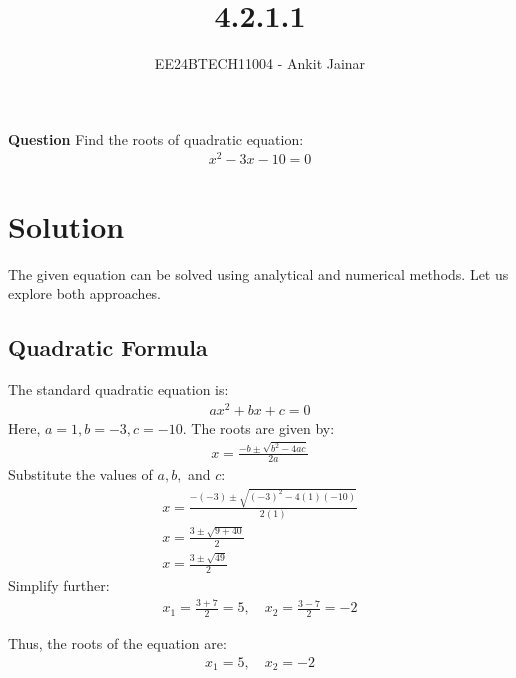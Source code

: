 \documentclass[journal]{IEEEtran}
\begin{document}

\vspace{3cm}

\title{4.2.1.1}
\author{EE24BTECH11004 - Ankit Jainar}
\maketitle

\renewcommand{\thefigure}{\theenumi}
\renewcommand{\thetable}{\theenumi}
\setlength{\intextsep}{10pt}


\textbf{Question}
Find the roots of quadratic equation:\\
\begin{align}
    x^2 - 3x - 10 = 0
\end{align}

\section*{Solution}
The given equation can be solved using analytical and numerical methods. Let us explore both approaches.

\subsection*{ Quadratic Formula}
The standard quadratic equation is:
\begin{align}
    ax^2 + bx + c = 0
\end{align}
Here, \( a = 1, b = -3, c = -10 \). The roots are given by:
\begin{align}
    x = \frac{-b \pm \sqrt{b^2 - 4ac}}{2a}
\end{align}
Substitute the values of \( a, b, \) and \( c \):
\begin{align}
    x = \frac{-(-3) \pm \sqrt{(-3)^2 - 4(1)(-10)}}{2(1)} \\
    x = \frac{3 \pm \sqrt{9 + 40}}{2} \\
    x = \frac{3 \pm \sqrt{49}}{2}
\end{align}
Simplify further:
\begin{align}
    x_1 = \frac{3 + 7}{2} = 5, \quad x_2 = \frac{3 - 7}{2} = -2
\end{align}

Thus, the roots of the equation are:
\begin{align}
    x_1 = 5, \quad x_2 = -2
\end{align}
\end{document}
